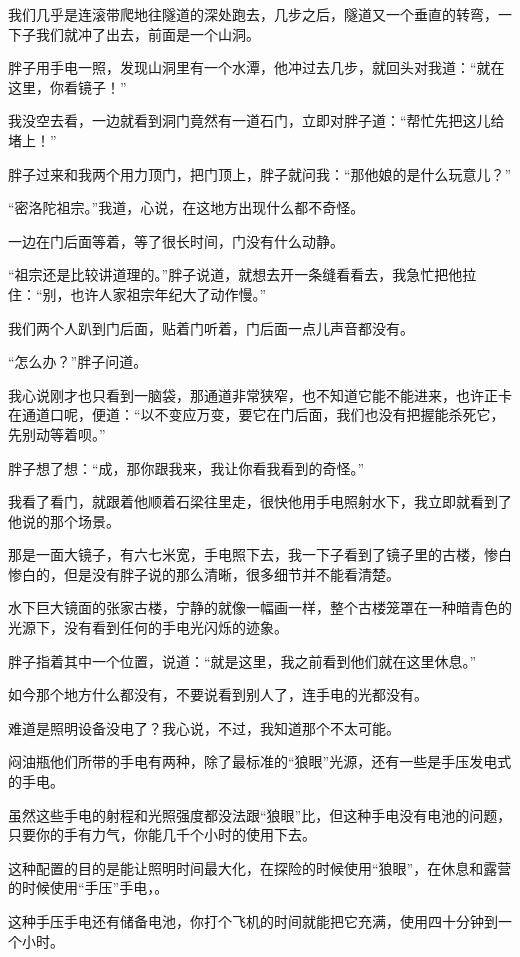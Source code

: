 我们几乎是连滚带爬地往隧道的深处跑去，几步之后，隧道又一个垂直的转弯，一下子我们就冲了出去，前面是一个山洞。

胖子用手电一照，发现山洞里有一个水潭，他冲过去几步，就回头对我道：“就在这里，你看镜子！”

我没空去看，一边就看到洞门竟然有一道石门，立即对胖子道：“帮忙先把这儿给堵上！”

胖子过来和我两个用力顶门，把门顶上，胖子就问我：“那他娘的是什么玩意儿？”

“密洛陀祖宗。”我道，心说，在这地方出现什么都不奇怪。

一边在门后面等着，等了很长时间，门没有什么动静。

“祖宗还是比较讲道理的。”胖子说道，就想去开一条缝看看去，我急忙把他拉住：“别，也许人家祖宗年纪大了动作慢。”

我们两个人趴到门后面，贴着门听着，门后面一点儿声音都没有。

“怎么办？”胖子问道。

我心说刚才也只看到一脑袋，那通道非常狭窄，也不知道它能不能进来，也许正卡在通道口呢，便道：“以不变应万变，要它在门后面，我们也没有把握能杀死它，先别动等着呗。”

胖子想了想：“成，那你跟我来，我让你看我看到的奇怪。”

我看了看门，就跟着他顺着石梁往里走，很快他用手电照射水下，我立即就看到了他说的那个场景。

那是一面大镜子，有六七米宽，手电照下去，我一下子看到了镜子里的古楼，惨白惨白的，但是没有胖子说的那么清晰，很多细节并不能看清楚。

水下巨大镜面的张家古楼，宁静的就像一幅画一样，整个古楼笼罩在一种暗青色的光源下，没有看到任何的手电光闪烁的迹象。

胖子指着其中一个位置，说道：“就是这里，我之前看到他们就在这里休息。”

如今那个地方什么都没有，不要说看到别人了，连手电的光都没有。

难道是照明设备没电了？我心说，不过，我知道那个不太可能。

闷油瓶他们所带的手电有两种，除了最标准的“狼眼”光源，还有一些是手压发电式的手电。

虽然这些手电的射程和光照强度都没法跟“狼眼”比，但这种手电没有电池的问题，只要你的手有力气，你能几千个小时的使用下去。

这种配置的目的是能让照明时间最大化，在探险的时候使用“狼眼”，在休息和露营的时候使用“手压”手电，。

这种手压手电还有储备电池，你打个飞机的时间就能把它充满，使用四十分钟到一个小时。

